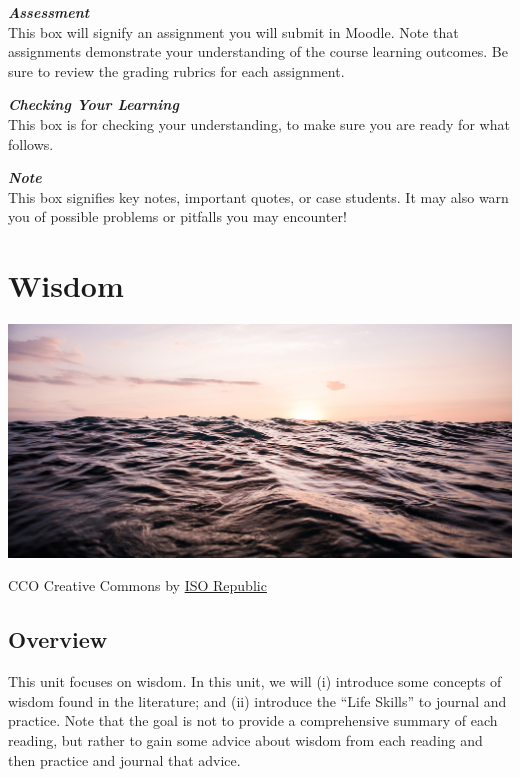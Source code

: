 \documentclass[
]{book}
\begin{document}
\begin{assessment}
\textbf{\emph{Assessment}}\\
This box will signify an assignment you will submit in Moodle. Note that
assignments demonstrate your understanding of the course learning
outcomes. Be sure to review the grading rubrics for each assignment.
\end{assessment}

\begin{progress}
\textbf{\emph{Checking Your Learning}}\\
This box is for checking your understanding, to make sure you are ready
for what follows.
\end{progress}

\begin{feedback}
\textbf{\emph{Note}}\\
This box signifies key notes, important quotes, or case students. It may
also warn you of possible problems or pitfalls you may encounter!
\end{feedback}

\hypertarget{wisdom}{%
\chapter{Wisdom}\label{wisdom}}

\includegraphics{assets/u1/Unit_1_Overview.png}

CCO Creative Commons by \href{https://isorepublic.com/photo/sun-reflecting-on-waves/}{ISO Republic}

\hypertarget{overview}{%
\section*{Overview}\label{overview}}

This unit focuses on wisdom. In this unit, we will (i) introduce some concepts of wisdom found in the literature; and (ii) introduce the ``Life Skills'' to journal and practice. Note that the goal is not to provide a comprehensive summary of each reading, but rather to gain some advice about wisdom from each reading and then practice and journal that advice.
\end{document}
